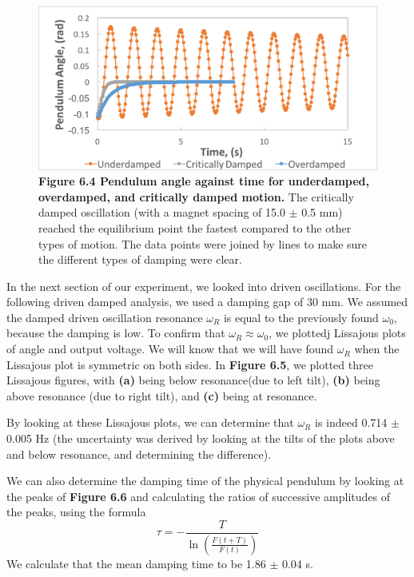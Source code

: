 \documentclass[11pt]{report}
\begin{document}
\begin{figure}
    \includegraphics[width=\linewidth]{ThreeDampGraph.png}
    \captionsetup{labelformat=empty}
    \caption{\textbf{Figure 6.4 Pendulum angle against time for underdamped,
    overdamped, and critically damped motion.} The critically damped oscillation
    (with a magnet spacing of 15.0 $\pm$ 0.5 mm)
reached the equilibrium point the fastest compared to the other types of motion.
The data points were joined by lines to make sure the different types of damping
were clear.}
\end{figure}

\bigskip
In the next section of our experiment, we looked into driven oscillations.  For
the following driven damped analysis, we used a damping gap of 30 mm.
We assumed the damped driven oscillation resonance $\omega_R$ is equal to the
previously found $\omega_0$, because the damping is low.  To confirm that
\(\omega_R \approx \omega_0\), we plottedj Lissajous plots of angle and output
voltage.  We will know that we will have found $\omega_R$ when the Lissajous
plot is symmetric on both sides.  In \textbf{Figure 6.5}, we plotted three
Lissajous figures, with \textbf{(a)} being below resonance(due to left tilt), 
\textbf{(b)} being above resonance (due to right tilt), and \textbf{(c)} being 
at resonance.  

By looking at these Lissajous plots, we can determine that $\omega_R$ is indeed
0.714 $\pm$ 0.005 Hz (the uncertainty was derived by looking at the tilts of the
plots above and below resonance, and determining the difference). 

We can also determine the damping time of the physical pendulum by looking at
the peaks of \textbf{Figure 6.6} and calculating the ratios of successive
amplitudes of the peaks, using the formula \[\tau = -\frac{T}{\ln(\frac{F(t +
T)}{F(t)})}\]  We calculate that the mean damping time to be 1.86 $\pm$ 0.04 s.  
\end{document}
